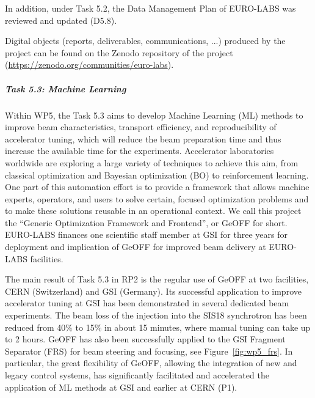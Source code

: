 In addition, under Task 5.2, the Data Management Plan of EURO-LABS was reviewed and updated (D5.8).

Digital objects (reports, deliverables, communications, ...) produced by the project can be found on the Zenodo repository of the project (\url{https://zenodo.org/communities/euro-labs}). 

\subparagraph{Task 5.3: Machine Learning} \mbox{} 


Within WP5, the Task 5.3 aims to develop Machine Learning (ML) methods to improve beam characteristics, transport efficiency, and reproducibility of accelerator tuning, which will reduce the beam preparation time and thus increase the available time for the experiments. Accelerator laboratories worldwide are exploring a large variety of techniques to achieve this aim, from classical optimization and Bayesian optimization (BO) to reinforcement learning. One part of this automation effort is to provide a framework that allows machine experts, operators, and users to solve certain, focused optimization problems and to make these solutions reusable in an operational context. We call this project the “Generic Optimization Framework and Frontend”, or GeOFF for short.  EURO-LABS finances one scientific staff
member at GSI for three years for deployment and implication of GeOFF for improved beam delivery at EURO-LABS facilities.

The main result of Task 5.3 in RP2 is the regular use of GeOFF at two facilities, CERN (Switzerland) and GSI (Germany). Its successful application to improve accelerator tuning at GSI has been demonstrated in several dedicated beam experiments. The beam loss of the injection into the SIS18 synchrotron has been reduced from 40$\%$ to 15$\%$ in about 15 minutes, where manual tuning can take up to 2 hours. GeOFF has also been successfully applied to the GSI Fragment Separator (FRS) for beam steering and focusing, see Figure~\ref{fig:wp5_frs}. In particular, the great flexibility of GeOFF, allowing the integration of new and legacy control systems, has significantly facilitated and accelerated the application of ML methods at GSI and earlier at CERN (P1). 


